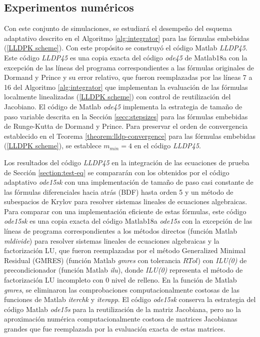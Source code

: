 \subsection{Experimentos numéricos}\label{section:num-exp-lldp-var-step}
Con este conjunto de simulaciones, se estudiará el desempeño del esquema adaptativo descrito en el Algoritmo \ref{alg:integrator} para las fórmulas embebidas (\ref{LLDPK scheme}). Con este propósito se construyó el código Matlab \emph{LLDP45}. Este código \emph{LLDP45} es una copia exacta del código \emph{ode45} \cite{shampine1997matlab} de Matlab18a con la excepción de las líneas del programa correspondientes a las fórmulas originales de Dormand y Prince y su error relativo, que fueron reemplazadas por las líneas 7 a 16 del Algoritmo \ref{alg:integrator} que implementan la evaluación de las fórmulas localmente linealizadas (\ref{LLDPK scheme}) con control de reutilización del Jacobiano. El código de Matlab \emph{ode45} implementa la estrategia de tamaño de paso variable descrita en la Sección \ref{secc:stepsizes} para las fórmulas embebidas de Runge-Kutta de Dormand y Prince. Para preservar el orden de convergencia establecido en el Teorema \ref{theorem:lldp-convergence} para las fórmulas embebidas (\ref{LLDPK scheme}), se establece $m_{min}=4$ en el código \emph{LLDP45}.

Los resultados del código \emph{LLDP45} en la integración de las ecuaciones de prueba de Sección \ref{section:test-eq} se compararán con los obtenidos por el código adaptativo \emph{ode15sk} con una implementación de tamaño de paso casi constante de las fórmulas diferenciales hacia atrás (BDF) hasta orden 5 y un método de subespacios de Krylov para resolver sistemas lineales de ecuaciones algebraicas. Para comparar con una implementación eficiente de estas fórmulas, este código \emph{ode15sk} es una copia exacta del código Matlab18a \emph{ode15s} \cite{shampine1997matlab} con la excepción de las líneas de programa correspondientes a los métodos directos (función Matlab \emph{mldivide}) para resolver sistemas lineales de ecuaciones algebraicas y la factorización LU, que fueron reemplazadas por el método Generalized Minimal Residual (GMRES) (función Matlab \emph{gmres} con tolerancia $RTol$) con \emph{ILU(0)} de precondicionador (función Matlab \emph{ilu}), donde \emph{ILU(0)} representa el método de factorización LU incompleto con 0 nivel de relleno. En la función de Matlab \emph{gmres}, se eliminaron las comprobaciones computacionalmente costosas de las funciones de Matlab \emph{iterchk} y \emph{iterapp}. El código \emph{ode15sk} conserva la estrategia del código Matlab \emph{ode15s} para la reutilización de la matriz Jacobiana, pero no la aproximación numérica computacionalmente costosa de matrices Jacobianas grandes que fue reemplazada por la evaluación exacta de estas matrices.

